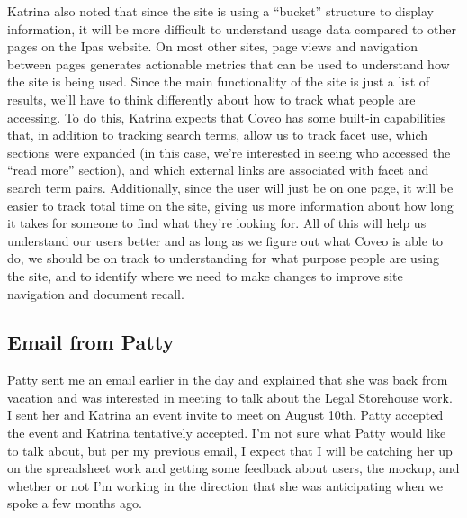 \documentclass{article}
\begin{document}
Katrina also noted that since the site is using a ``bucket'' structure to display information, it will be more difficult to understand usage data compared to other pages on the Ipas website. On most other sites, page views and navigation between pages generates actionable metrics that can be used to understand how the site is being used. Since the main functionality of the site is just a list of results, we'll have to think differently about how to track what people are accessing. To do this, Katrina expects that Coveo has some built-in capabilities that, in addition to tracking search terms, allow us to track facet use, which sections were expanded (in this case, we're interested in seeing who accessed the ``read more'' section), and which external links are associated with facet and search term pairs. Additionally, since the user will just be on one page, it will be easier to track total time on the site, giving us more information about how long it takes for someone to find what they're looking for. All of this will help us understand our users better and as long as we figure out what Coveo is able to do, we should be on track to understanding for what purpose people are using the site, and to identify where we need to make changes to improve site navigation and document recall.

\subsection{Email from Patty}
Patty sent me an email earlier in the day and explained that she was back from vacation and was interested in meeting to talk about the Legal Storehouse work. I sent her and Katrina an event invite to meet on August 10th. Patty accepted the event and Katrina tentatively accepted. I'm not sure what Patty would like to talk about, but per my previous email, I expect that I will be catching her up on the spreadsheet work and getting some feedback about users, the mockup, and whether or not I'm working in the direction that she was anticipating when we spoke a few months ago. 
\end{document}
